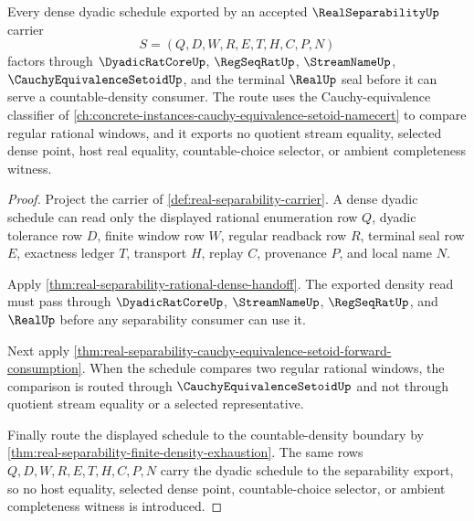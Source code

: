 \begin{theorem}
\label{thm:real-separability-l10-density-certificate}
Every dense dyadic schedule exported by an accepted $\RealSeparabilityUp$ carrier
$$
S=(Q,D,W,R,E,T,H,C,P,N)
$$
factors through $\DyadicRatCoreUp$, $\RegSeqRatUp$, $\StreamNameUp$, $\CauchyEquivalenceSetoidUp$, and the terminal $\RealUp$ seal before it can serve a countable-density consumer. The route uses the Cauchy-equivalence classifier of \autoref{ch:concrete-instances-cauchy-equivalence-setoid-namecert} to compare regular rational windows, and it exports no quotient stream equality, selected dense point, host real equality, countable-choice selector, or ambient completeness witness.
\end{theorem}
\begin{proof}
Project the carrier of \autoref{def:real-separability-carrier}. A dense dyadic schedule can read only the displayed rational enumeration row $Q$, dyadic tolerance row $D$, finite window row $W$, regular readback row $R$, terminal seal row $E$, exactness ledger $T$, transport $H$, replay $C$, provenance $P$, and local name $N$.

Apply \autoref{thm:real-separability-rational-dense-handoff}. The exported density read must pass through $\DyadicRatCoreUp$, $\StreamNameUp$, $\RegSeqRatUp$, and $\RealUp$ before any separability consumer can use it.

Next apply \autoref{thm:real-separability-cauchy-equivalence-setoid-forward-consumption}. When the schedule compares two regular rational windows, the comparison is routed through $\CauchyEquivalenceSetoidUp$ and not through quotient stream equality or a selected representative.

Finally route the displayed schedule to the countable-density boundary by \autoref{thm:real-separability-finite-density-exhaustion}. The same rows $Q,D,W,R,E,T,H,C,P,N$ carry the dyadic schedule to the separability export, so no host equality, selected dense point, countable-choice selector, or ambient completeness witness is introduced.
\end{proof}

